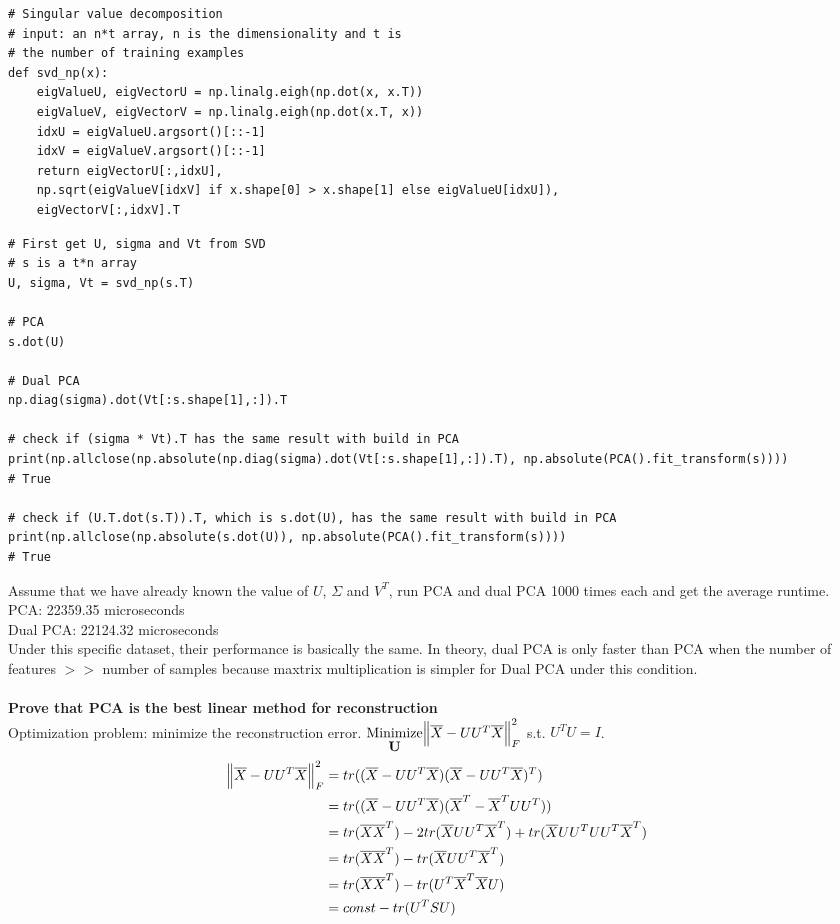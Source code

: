 \documentclass[12pt]{article}
\begin{document}
\begin{spacing}{1.0}
\begin{lstlisting}
# Singular value decomposition
# input: an n*t array, n is the dimensionality and t is 
# the number of training examples
def svd_np(x):
    eigValueU, eigVectorU = np.linalg.eigh(np.dot(x, x.T))
    eigValueV, eigVectorV = np.linalg.eigh(np.dot(x.T, x))
    idxU = eigValueU.argsort()[::-1]
    idxV = eigValueV.argsort()[::-1]
    return eigVectorU[:,idxU], 
    np.sqrt(eigValueV[idxV] if x.shape[0] > x.shape[1] else eigValueU[idxU]), 
    eigVectorV[:,idxV].T
\end{lstlisting}
\begin{lstlisting}
# First get U, sigma and Vt from SVD
# s is a t*n array
U, sigma, Vt = svd_np(s.T)

# PCA
s.dot(U)

# Dual PCA
np.diag(sigma).dot(Vt[:s.shape[1],:]).T

# check if (sigma * Vt).T has the same result with build in PCA
print(np.allclose(np.absolute(np.diag(sigma).dot(Vt[:s.shape[1],:]).T), np.absolute(PCA().fit_transform(s))))
# True

# check if (U.T.dot(s.T)).T, which is s.dot(U), has the same result with build in PCA
print(np.allclose(np.absolute(s.dot(U)), np.absolute(PCA().fit_transform(s))))
# True
\end{lstlisting}
\end{spacing}
\noindent
Assume that we have already known the value of $U$, $\Sigma$ and $V^T$, run PCA and dual PCA 1000 times each and get the average runtime.\\
PCA: 22359.35 microseconds\\
Dual PCA: 22124.32 microseconds\\
Under this specific dataset, their performance is basically the same. In theory, dual PCA is only faster than PCA when the number of features $>>$ number of samples because maxtrix multiplication is simpler for Dual PCA under this condition.\\\\
\textbf{Prove that PCA is the best linear method for reconstruction}\\
Optimization problem: minimize the reconstruction error. $\stackunder{Minimize}{\textbf{U}}\norm{\overline{X}-UU^T\overline{X}}_F^2$ s.t. $U^TU=I$.
\begin{equation}
\begin{split}
\norm{\overline{X}-UU^T\overline{X}}_F^2 & = tr((\overline{X}-UU^T\overline{X})(\overline{X}-UU^T\overline{X})^T)\\
& = tr((\overline{X}-UU^T\overline{X})(\overline{X}^T-\overline{X}^TUU^T))\\
& = tr(\overline{X}\overline{X}^T) - 2tr(\overline{X}UU^T\overline{X}^T) + tr(\overline{X}UU^TUU^T\overline{X}^T)\\
& = tr(\overline{X}\overline{X}^T) - tr(\overline{X}UU^T\overline{X}^T)\\
& = tr(\overline{X}\overline{X}^T) - tr(U^T\overline{X}^T\overline{X}U)\\
& = const - tr(U^TSU)
\end{split}
\end{equation}
\end{document}
